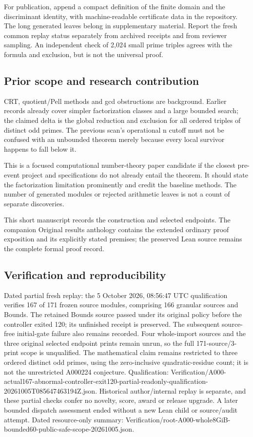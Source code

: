 \documentclass[11pt,a4paper]{article}
\begin{document}
For publication, append a compact definition of the finite domain and the discriminant identity, with machine-readable certificate data in the repository. The long generated leaves belong in supplementary material. Report the fresh common replay status separately from archived receipts and from reviewer sampling. An independent check of 2,024 small prime triples agrees with the formula and exclusion, but is not the universal proof.

\subsection{Prior scope and research contribution}
CRT, quotient/Pell methods and gcd obstructions are background. Earlier records already cover simpler factorization classes and a large bounded search; the claimed delta is the global reduction and exclusion for all ordered triples of distinct odd primes. The previous scan's operational n cutoff must not be confused with an unbounded theorem merely because every local survivor happens to fall below it.

This is a focused computational number-theory paper candidate if the closest pre-event project and specifications do not already entail the theorem. It should state the factorization limitation prominently and credit the baseline methods. The number of generated modules or rejected arithmetic leaves is not a count of separate discoveries.

{\small This short manuscript records the construction and selected endpoints. The companion Original results anthology contains the extended ordinary proof exposition and its explicitly stated premises; the preserved Lean source remains the complete formal proof record.\par}

\subsection{Verification and reproducibility}
Dated partial fresh replay: the 5 October 2026, 08:56:47 UTC qualification verifies 167 of 171 frozen source modules, comprising 166 granular sources and Bounds. The retained Bounds source passed under its original policy before the controller exited 120; its unfinished receipt is preserved. The subsequent source-free initial-gate failure also remains recorded. Four whole-import sources and the three original selected endpoint prints remain unrun, so the full 171-source/3-print scope is unqualified. The mathematical claim remains restricted to three ordered distinct odd primes, using the zero-inclusive quadratic-residue count; it is not the unrestricted A000224 conjecture. Qualification: Verification/A000-actual167-abnormal-controller-exit120-partial-readonly-qualification-20261005T085647463194Z.json. Historical author/internal replay is separate, and these partial checks confer no novelty, score, award or release upgrade. A later bounded dispatch assessment ended without a new Lean child or source/audit attempt. Dated resource-only summary: Verification/root-A000-whole8GiB-bounded60-public-safe-scope-20261005.json.
\end{document}
